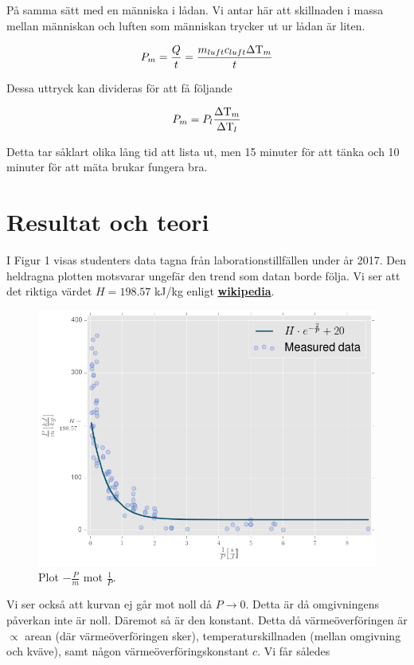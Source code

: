 \documentclass[11pt]{article}
\begin{document}
På samma sätt med en människa i lådan. Vi antar här att skillnaden i massa mellan människan och luften som människan trycker ut ur lådan är liten.

\begin{equation*}
    P_m = \frac{Q}{t} = \frac{m_{luft} c_{luft} \Delta \text T_m}{t}
\end{equation*}

Dessa uttryck kan divideras för att få följande

\begin{equation*}
    P_m = P_l \frac{\Delta \text T_m}{\Delta \text T_l}
\end{equation*}

Detta tar såklart olika lång tid att lista ut, men 15 minuter för att tänka och 10 minuter för att mäta brukar fungera bra.

\section{Resultat och teori}

I Figur 1 visas studenters data tagna från laborationstillfällen under år 2017. Den heldragna plotten motsvarar ungefär den trend som datan borde följa. Vi ser att det riktiga värdet $H = 198.57$ kJ/kg enligt \href{https://en.wikipedia.org/wiki/Nitrogen}{\textbf{wikipedia}}.

\begin{figure}[h]
\center
    \includegraphics[width = .75\linewidth]{nitrogenEnthalpy.png}
    \caption{Plot $- \frac{P}{\dot m}$ mot $\frac{1}{P}$.}
\end{figure}

Vi ser också att kurvan ej går mot noll då $P \to 0$. Detta är då omgivningens påverkan inte är noll. Däremot så är den konstant. Detta då värmeöverföringen är $\propto$ arean (där värmeöverföringen sker), temperaturskillnaden (mellan omgivning och kväve), samt någon värmeöverföringskonstant $c$. Vi får således
\end{document}

